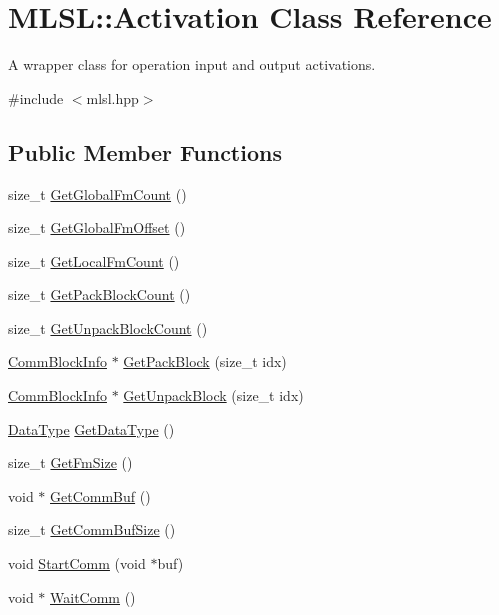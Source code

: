 \hypertarget{classMLSL_1_1Activation}{\section{M\-L\-S\-L\-:\-:Activation Class Reference}
\label{classMLSL_1_1Activation}
}


A wrapper class for operation input and output activations.  




{\ttfamily \#include $<$mlsl.\-hpp$>$}

\subsection*{Public Member Functions}
\begin{DoxyCompactItemize}
\item 
size\-\_\-t \hyperlink{classMLSL_1_1Activation_af105b2a9b3f3ca51f71a5372c8af8012}{Get\-Global\-Fm\-Count} ()
\item 
size\-\_\-t \hyperlink{classMLSL_1_1Activation_a7b3f57465e6e485920d6df70eec212e7}{Get\-Global\-Fm\-Offset} ()
\item 
size\-\_\-t \hyperlink{classMLSL_1_1Activation_adbc1a830a339e767da99d5721b50b0c0}{Get\-Local\-Fm\-Count} ()
\item 
size\-\_\-t \hyperlink{classMLSL_1_1Activation_a99c80c7951309ae0f1b809d50da061d9}{Get\-Pack\-Block\-Count} ()
\item 
size\-\_\-t \hyperlink{classMLSL_1_1Activation_a7149c6eab8edb219a88688ae63ce7c6c}{Get\-Unpack\-Block\-Count} ()
\item 
\hyperlink{classMLSL_1_1CommBlockInfo}{Comm\-Block\-Info} $\ast$ \hyperlink{classMLSL_1_1Activation_a6927390c4660175b74add98320b740f6}{Get\-Pack\-Block} (size\-\_\-t idx)
\item 
\hyperlink{classMLSL_1_1CommBlockInfo}{Comm\-Block\-Info} $\ast$ \hyperlink{classMLSL_1_1Activation_a0f706f93ca26c1f522d6d7f56a72d878}{Get\-Unpack\-Block} (size\-\_\-t idx)
\item 
\hyperlink{namespaceMLSL_a09825f36959e78645dd9bc70bdf840ba}{Data\-Type} \hyperlink{classMLSL_1_1Activation_a6df9d76224dbe137b88fea2c55ce3708}{Get\-Data\-Type} ()
\item 
size\-\_\-t \hyperlink{classMLSL_1_1Activation_ad7ef946e5e52a5cbc2c39ed147a814e6}{Get\-Fm\-Size} ()
\item 
void $\ast$ \hyperlink{classMLSL_1_1Activation_ac05d33b303e0f33acfff79a8d99cf267}{Get\-Comm\-Buf} ()
\item 
size\-\_\-t \hyperlink{classMLSL_1_1Activation_a46a52035bdde07e3d8501745e7023baa}{Get\-Comm\-Buf\-Size} ()
\item 
void \hyperlink{classMLSL_1_1Activation_a23a1448b3653d0f950b004fb901f8ae0}{Start\-Comm} (void $\ast$buf)
\item 
void $\ast$ \hyperlink{classMLSL_1_1Activation_a8ea1aa22f4f0d55e7334839cdb005356}{Wait\-Comm} ()
\end{DoxyCompactItemize}


